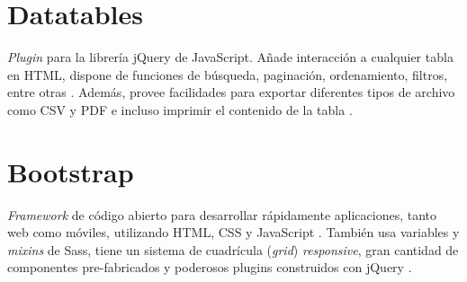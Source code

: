 \section{Datatables}

\textit{Plugin} para la librería jQuery de JavaScript. Añade interacción
a cualquier tabla en HTML, dispone de funciones de búsqueda, paginación,
ordenamiento, filtros, entre otras \cite{Datatables}. Además, provee facilidades para exportar diferentes tipos de archivo como CSV y PDF e incluso imprimir el contenido de la tabla \cite{Datatables}.

\section{Bootstrap}

\textit{Framework} de código abierto para desarrollar rápidamente
aplicaciones, tanto web como móviles, utilizando HTML, CSS y JavaScript \cite{Bootstrap}.
También usa variables y \textit{mixins} de Sass, tiene un sistema de cuadrícula
(\textit{grid}) \textit{responsive}, gran cantidad de componentes pre-fabricados y poderosos plugins construidos con jQuery \cite{Bootstrap}.
